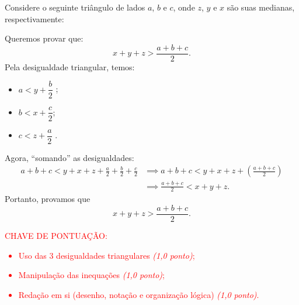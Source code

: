 

Considere o seguinte triângulo de lados $a$, $b$ e $c$, onde $z$, $y$ e $x$ são
suas medianas, respectivamente:

\begin{center}
\end{center}

Queremos provar que: $$x + y + z > \dfrac{a+b+c}{2}.$$ Pela desigualdade
triangular, temos:
\begin{itemize}
    \item  $a < y + \dfrac{b}{2}$ ;
    \item $b < x + \dfrac{c}{2}$;
    \item  $c < z + \dfrac{a}{2}$ .
\end{itemize}
Agora, ``somando'' as desigualdades:
\begin{align*}
    a + b + c < y + x + z + \frac{a}{2} + \frac{b}{2} + \frac{c}{2}
     & \implies a + b + c < y + x + z + \left(\frac{a+b+c}{2}\right) \\
     & \implies \frac{a+b+c}{2} < x+y+z.
\end{align*}
Portanto, provamos que $$x+y+z > \frac{a+b+c}{2}.$$






\bigskip

\textcolor{red}{CHAVE DE PONTUAÇÃO:
    \begin{itemize}
        \item  Uso das 3 desigualdades triangulares \emph{(1,0 ponto)};
        \item Manipulação das inequações \emph{(1,0 ponto)};
        \item  Redação em si (desenho, notação e organização lógica) \emph{(1,0 ponto)}.
    \end{itemize} }